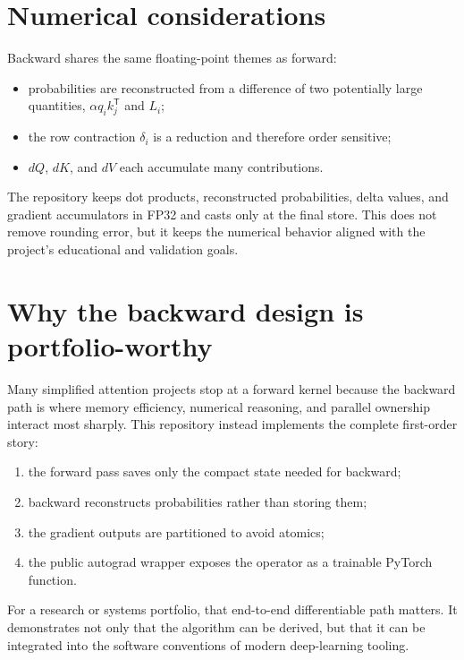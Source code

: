 \section{Numerical considerations}

Backward shares the same floating-point themes as forward:
\begin{itemize}
  \item probabilities are reconstructed from a difference of two potentially large quantities, $\alpha q_i k_j^{\mathsf T}$ and $L_i$;
  \item the row contraction $\delta_i$ is a reduction and therefore order sensitive;
  \item $dQ$, $dK$, and $dV$ each accumulate many contributions.
\end{itemize}
The repository keeps dot products, reconstructed probabilities, delta values, and gradient accumulators in FP32 and casts only at the final store. This does not remove rounding error, but it keeps the numerical behavior aligned with the project's educational and validation goals.

\section{Why the backward design is portfolio-worthy}

Many simplified attention projects stop at a forward kernel because the backward path is where memory efficiency, numerical reasoning, and parallel ownership interact most sharply. This repository instead implements the complete first-order story:
\begin{enumerate}
  \item the forward pass saves only the compact state needed for backward;
  \item backward reconstructs probabilities rather than storing them;
  \item the gradient outputs are partitioned to avoid atomics;
  \item the public autograd wrapper exposes the operator as a trainable PyTorch function.
\end{enumerate}

For a research or systems portfolio, that end-to-end differentiable path matters. It demonstrates not only that the algorithm can be derived, but that it can be integrated into the software conventions of modern deep-learning tooling.

